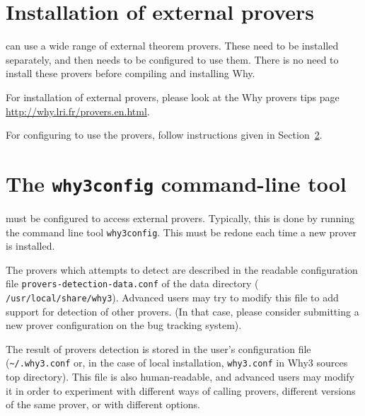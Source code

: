\section{Installation of external provers}\label{provers}

\why can use a wide range of external theorem provers. These need to
be installed separately, and then \why needs to be configured to use
them. There is no need to install these provers before compiling and
installing Why.

For installation of external provers, please look at the Why provers
tips page \url{http://why.lri.fr/provers.en.html}.

For configuring \why to use the provers, follow instructions given in
Section~\ref{sec:why3config}.

\section{The \texttt{why3config} command-line tool}
\label{sec:why3config}

\why must be configured to access external provers. Typically, this is done
by running
the command line tool \texttt{why3config}.
This must be redone each time a new prover is installed.

The provers which \why attempts to detect are described in
the readable configuration file \texttt{provers-detection-data.conf}
of the \why data directory (\eg{}
\texttt{/usr/local/share/why3}). Advanced users may try to modify this
file to add support for detection of other provers. (In that case,
please consider submitting a new prover configuration on the bug
tracking system).

The result of provers detection is stored in the user's
configuration file (\verb+~/.why3.conf+ or, in the case of local
installation, \verb+why3.conf+ in Why3 sources top directory). This file
is also human-readable, and advanced users may modify it in order to
experiment with different ways of calling provers, \eg{} different
versions of the same prover, or with different options.

